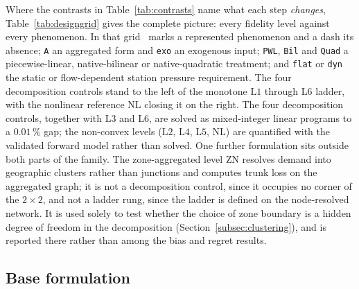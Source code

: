 \documentclass[a4paper,fleqn]{cas-sc}
\newcommand{\ZN}{\ensuremath{\mathrm{ZN}}}      %
\newcommand{\Lone}{\ensuremath{\mathrm{L1}}}    %
\newcommand{\Ltwo}{\ensuremath{\mathrm{L2}}}    %
\newcommand{\Lthree}{\ensuremath{\mathrm{L3}}}  %
\newcommand{\Lfour}{\ensuremath{\mathrm{L4}}}   %
\newcommand{\Lfive}{\ensuremath{\mathrm{L5}}}   %
\newcommand{\Lsix}{\ensuremath{\mathrm{L6}}}    %
\newcommand{\NLref}{\ensuremath{\mathrm{NL}}}   %
\renewcommand{\checkmark}{\ding{51}}
\newcommand{\new}[1]{\textcolor[HTML]{1A5FB4}{#1}}   %
\newcommand{\new}[1]{#1}
\begin{document}
Where the contrasts in Table~\ref{tab:contrasts} name what each step \emph{changes},
Table~\ref{tab:designgrid} gives the complete picture: every fidelity level against every
phenomenon. In that grid \checkmark\ marks a represented phenomenon and a dash its absence;
\texttt{A} an aggregated form and \texttt{exo} an exogenous input; \texttt{PWL}, \texttt{Bil}
and \texttt{Quad} a piecewise-linear, native-bilinear or native-quadratic treatment; and
\texttt{flat} or \texttt{dyn} the static or flow-dependent station pressure requirement. The
four decomposition controls stand to the left of the monotone $\Lone$ through $\Lsix$ ladder,
with the nonlinear reference $\NLref$ closing it on the right.
The four decomposition controls, together with $\Lthree$ and $\Lsix$, are solved as
mixed-integer linear programs to a $0.01$\,\% gap; the non-convex levels
($\Ltwo$, $\Lfour$, $\Lfive$, $\NLref$) are quantified with the validated forward model
rather than solved. 
One further formulation sits outside both parts of the family. The zone-aggregated level
$\ZN$ resolves demand into geographic clusters rather than junctions and computes trunk
loss on the aggregated graph; it is not a decomposition control, since it occupies no
corner of the $2\times2$, and not a ladder rung, since the ladder is defined on the
node-resolved network. It is used solely to test whether the choice of zone boundary is a
hidden degree of freedom in the decomposition (Section~\ref{subsec:clustering}), and is
reported there rather than among the bias and regret results.



\subsection{Base formulation}
\new{}
\end{document}
